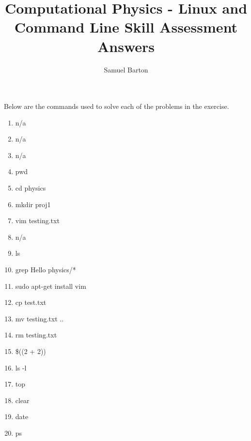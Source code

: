 \documentclass{article}
\title{Computational Physics - Linux and Command Line Skill Assessment Answers}
\author {Samuel Barton}
\begin{document}
	
	\maketitle
	
Below are the commands used to solve each of the problems in the exercise.
	
	\begin{enumerate}
		\item n/a
		\item n/a
		\item n/a
		\item pwd
		\item cd physics
		\item mkdir proj1
		\item vim testing.txt
		\item n/a
		\item ls
		\item grep Hello physics/*
		\item sudo apt-get install vim
		\item cp test.txt ~
		\item mv testing.txt ..
		\item rm testing.txt
		\item \$((2 + 2))
		\item ls -l
		\item top
		\item clear
		\item date
		\item ps
	\end{enumerate}
\end{document}
